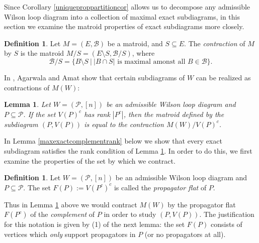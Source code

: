 \documentclass[11pt]{article}
\newcommand{\cP}{\mathcal{P}}
\newcommand{\cB}{\mathcal{B}}
\newtheorem{lem}[thm]{Lemma}
\theoremstyle{remark}
\theoremstyle{definition}
\newtheorem{dfn}[thm]{Definition}
\begin{document}
Since Corollary \ref{uniqueproppartitioncor} allows us to decompose any admissible Wilson loop diagram into a collection of maximal exact subdiagrams, in this section we examine the matroid properties of exact subdiagrams more closely.

\begin{dfn}\label{matroid contraction}
Let $M = (E,\cB)$ be a matroid, and $S \subseteq E$. The {\em contraction} of $M$ by $S$ is the matroid $M/S = (E \setminus S, \cB / S)$, where
\[\cB / S = \{B \setminus S \ \big| \ |B\cap S | \text{ is maximal amonst all }B \in \cB\}.\]
\end{dfn}

In \cite{wilsonloop}, Agarwala and Amat show that certain subdiagrams of $W$ can be realized as contractions of $M(W)$:

\begin{lem} \label{contractsubdiaglem} \cite[Theorem 3.33]{wilsonloop} 
Let $W = (\cP, [n])$ be an admissible Wilson loop diagram and $P \subseteq \cP$. If the set $V(P)^c$ has rank $|P^c|$, then the matroid defined by the subdiagram $(P, V(P))$ is equal to the contraction $M(W)/V(P)^c$.
\end{lem}


In Lemma \ref{maxexactcomplementrank} below we show that every exact subdiagram satisfies the rank condition of Lemma \ref{contractsubdiaglem}. In order to do this, we first examine the properties of the set by which we contract.

\begin{dfn}\label{def prop flat}
Let $W = (\cP,[n])$ be an admissible Wilson loop diagram and $P \subseteq \cP$. The set $F(P) := V(P^c)^c$ is called the {\em propagator flat} of $P$.
\end{dfn}
Thus in Lemma \ref{contractsubdiaglem} above we would contract $M(W)$ by the propagator flat $F(P^c)$ of the {\em complement} of $P$ in order to study $(P,V(P))$. The justification for this notation is given by (1) of the next lemma: the set $F(P)$ consists of vertices which {\em only} support propagators in $P$ (or no propagators at all).
\end{document}
